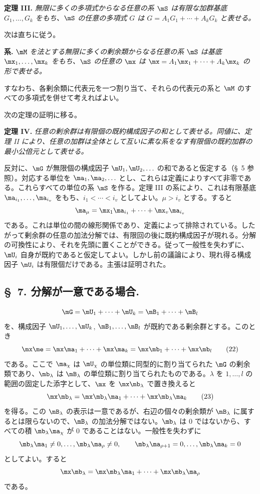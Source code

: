 \documentclass[11pt]{article}
\begin{document}
\textbf{定理 III.} \emph{無限に多くの多項式からなる任意の系 $\mS$ は有限な加群基底 $G_1,
\ldots,G_k$ をもち、$\mS$ の任意の多項式 $G$ は $G=A_1G_1+
\cdots+A_kG_k$ と表せる。}

次は直ちに従う。

\textbf{系.} \emph{$\mM$ を法とする無限に多くの剰余類からなる任意の系 $\mS$ は基底 $\mx_1,
\ldots,\mx_k$ をもち、$\mS$ の任意の $\mx$ は $\mx=A_1\mx_1+
\cdots+A_k\mx_k$ の形で表せる。}

すなわち、各剰余類に代表元を一つ割り当て、それらの代表元の系と $\mM$ のすべての多項式を併せて考えればよい。

次の定理の証明に移る。

\textbf{定理 IV.} \emph{任意の剰余群は有限個の既約構成因子の和として表せる。同値に、定理 II により、任意の加群は全体として互いに素な系をなす有限個の既約加群の最小公倍元として表せる。}

反対に、$\mG$ が無限個の構成因子 $\mU_1,\mU_2,
\ldots$ の和であると仮定する（\S~5 参照）。対応する単位を $\ma_1,
\ma_2,
\ldots$ とし、これらは定義によりすべて非零である。これらすべての単位の系 $\mS$ を作る。定理 III の系により、これは有限基底 $\ma_{i_1},
\ldots,\ma_{i_v}$ をもち、$i_1<\cdots<i_v$ としてよい。$\mu>i_v$ とする。すると
\[
 \ma_\mu=\mx_1\ma_{i_1}+\cdots+\mx_v\ma_{i_v}
\]
である。これは単位の間の線形関係であり、定義によって排除されている。したがって剰余群の任意の加法分解では、有限回の後に既約構成因子が現れる。分解の可換性により、それを先頭に置くことができる。従って一般性を失わずに、$\mU_i$ 自身が既約であると仮定してよい。しかし前の議論により、現れ得る構成因子 $\mU_i$ は有限個だけである。主張は証明された。

\subsection*{\S~7. 分解が一意である場合.}

\[
 \mG=\mU_1+\cdots+\mU_k=\mB_1+\cdots+\mB_l
\]
を、構成因子 $\mU_1,
\ldots,\mU_k$, $\mB_1,
\ldots,\mB_l$ が既約である剰余群とする。このとき
\begin{equation}
 \mx\me=\mx\ma_1+\cdots+\mx\ma_k
 =\mx\mb_1+\cdots+\mx\mb_l
\tag{22}
\end{equation}
である。ここで $\ma_\chi$ は $\mU_\chi$ の単位類に同型的に割り当てられた $\mG$ の剰余類であり、$\mb_\lambda$ は $\mB_\lambda$ の単位類に割り当てられたものである。$\lambda$ を $1,
\ldots,l$ の範囲の固定した添字として、$\mx$ を $\mx\mb_\lambda$ で置き換えると
\begin{equation}
 \mx\mb_\lambda=\mx\mb_\lambda\ma_1+\cdots+\mx\mb_\lambda\ma_k
\tag{23}
\end{equation}
を得る。この $\mB_\lambda$ の表示は一意であるが、右辺の個々の剰余類が $\mB_\lambda$ に属するとは限らないので、$\mB_\lambda$ の加法分解ではない。$\mb_\lambda$ は 0 ではないから、すべての積 $\mb_\lambda\ma_\chi$ が 0 であることはない。一般性を失わずに
\[
 \mb_\lambda\ma_1\ne0,
 \ldots,
 \mb_\lambda\ma_\rho\ne0,
 \qquad
 \mb_\lambda\ma_{\rho+1}=0,
 \ldots,
 \mb_\lambda\ma_k=0
\]
としてよい。すると
\[
 \mx\mb_\lambda=\mx\mb_\lambda\ma_1+\cdots+\mx\mb_\lambda\ma_\rho
\]
である。
\end{document}
